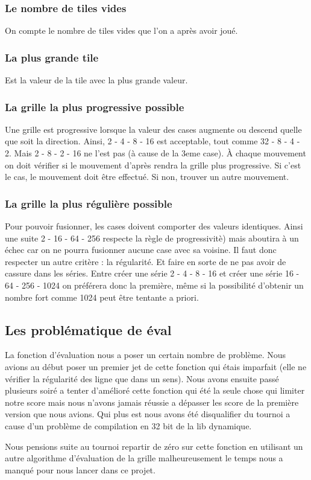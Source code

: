 \documentclass[12pt]{article}
\begin{document}
\subsubsection{Le nombre de tiles vides}
On compte le nombre de tiles vides que l'on a après avoir joué.
\subsubsection{La plus grande tile} 
Est la valeur de la tile avec la plus grande valeur.

\subsubsection{La grille la plus progressive possible}
Une grille est progressive lorsque la valeur des cases augmente ou descend
quelle que soit la direction. Ainsi, 2 - 4 - 8 - 16 est acceptable, tout comme
32 - 8 - 4 - 2. Mais 2 - 8 - 2 - 16 ne l'est pas (\`a cause de la 3eme case).
\`A chaque mouvement on doit vérifier si  le mouvement d'apr\`es rendra la
grille plus progressive. Si c'est le cas, le mouvement doit \^etre effectu\'e.
Si non, trouver un autre mouvement.

\subsubsection{La grille la plus réguli\`ere possible}
Pour pouvoir fusionner, les cases doivent comporter des valeurs identiques.
Ainsi une suite 2 - 16 - 64 - 256 respecte la r\`egle de progressivit\`e) mais
aboutira à un \'echec car on ne pourra fusionner aucune case avec sa voisine. Il
faut donc respecter un autre crit\`ere : la r\'egularit\'e. Et faire en sorte de
ne pas avoir de cassure dans les s\'eries. Entre cr\'eer une série 2 - 4 - 8 -
16 et cr\'eer une s\'erie 16 - 64 - 256 - 1024 on pr\'ef\'erera donc la
premi\`ere, m\^eme si la possibilit\'e d'obtenir un nombre fort comme 1024 peut
\^etre tentante a priori.

\subsection{Les problématique de éval}
La fonction d'évaluation nous a poser un certain nombre de problème. Nous avions au début poser
un premier jet de cette fonction qui étais imparfait (elle ne vérifier la régularité des ligne que
dans un sens). Nous avons ensuite passé plusieurs soiré a tenter d’amélioré cette fonction qui été
la seule chose qui limiter notre score mais nous n'avons jamais réussie a dépasser
les score de la première version que nous avions. Qui plus est nous avons été disqualifier
du tournoi a cause d'un problème de compilation en 32 bit de la lib dynamique.
\par Nous pensions suite au tournoi repartir de zéro sur cette fonction
en utilisant un autre algorithme d'évaluation de la grille malheureusement
le temps nous a manqué pour nous lancer dans ce projet.
\end{document}
